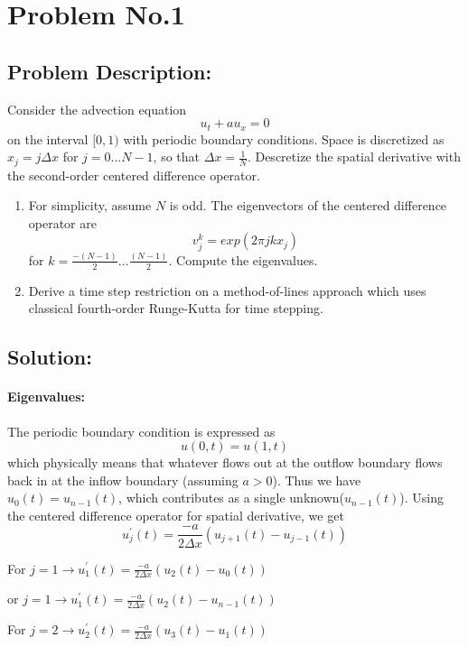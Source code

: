 \section{Problem No.1}
\subsection{Problem Description:} 
Consider the advection equation
$$
u_{t}+ au_{x}=0
$$
on the interval $[0,1)$ with periodic boundary conditions. Space is discretized as $x_{j}=j\Delta x$ for $j=0...N-1$, so that $\Delta x=\frac{1}{N}$. Descretize the spatial derivative with the second-order centered difference operator.

\begin{enumerate}
\item For simplicity, assume $N$ is odd. The eigenvectors of the centered difference operator are
$$
v_{j}^{k} = exp(2\pi jkx_{j})
$$
for $k=\frac{-(N-1)}{2}...\frac{(N-1)}{2}$. Compute the eigenvalues.
\item Derive a time step restriction on a method-of-lines approach which uses classical fourth-order Runge-Kutta for time stepping.
\end{enumerate}

\subsection{Solution:}\label{sec:prob1_sol}
\paragraph{Eigenvalues:}
The periodic boundary condition is expressed as 
$$
u(0,t) = u (1,t) 
$$
which physically means that whatever flows out at the outflow boundary flows back in at the inflow boundary (assuming $a>0$)\cite{hoffmann2000computational}. Thus we have $u_0(t)=u_{n-1}(t)$, which contributes as a single unknown($u_{n-1}(t)$). Using the centered difference operator for spatial derivative, we get 
$$
u_{j}^{\prime}(t) = \frac{-a}{2\Delta x}(u_{j+1}(t)-u_{j-1}(t))
$$
\vspace{2mm}

For $j=1\longrightarrow u_{1}^{\prime}(t)=\frac{-a}{2\Delta x}(u_{2}(t)-u_{0}(t))$ 
\vspace{2mm}

or $j=1\longrightarrow u_{1}^{\prime}(t)=\frac{-a}{2\Delta x}(u_{2}(t)-u_{n-1}(t))$ 
\vspace{2mm}

For $j=2\longrightarrow u_{2}^{\prime}(t)=\frac{-a}{2\Delta x}(u_{3}(t)-u_{1}(t))$ 
\vspace{2mm}

